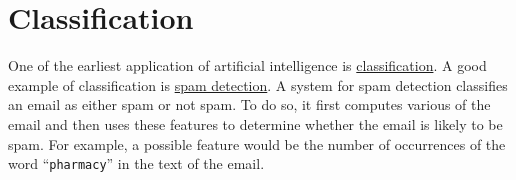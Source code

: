 \chapter{Classification \label{chapter:classification}}
One of the earliest application of artificial intelligence is 
\href{https://en.wikipedia.org/wiki/Statistical_classification}{classification}.  A good
example of classification is \href{https://en.wikipedia.org/wiki/Anti-spam_techniques#Detecting_spam}{spam detection}.
A system for spam detection classifies an email as either spam or not spam.  To do so, it first
computes various  of the email and then uses these features to determine whether the email is
likely to be spam.  For example, a possible feature would be the number of occurrences of the word
``\texttt{pharmacy}'' in the text of the email.

